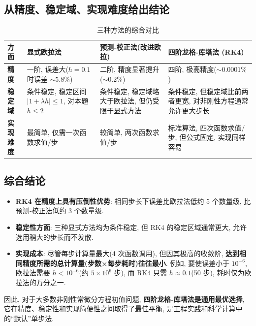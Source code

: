 \documentclass[12pt,a4paper]{ctexart}
\begin{document}
\subsection{从精度、稳定域、实现难度给出结论}

\begin{table}[H]
\centering
\caption{三种方法的综合对比}
\begin{tabularx}{\textwidth}{lXXX}
\toprule
方面 & 显式欧拉法 & 预测‑校正法(改进欧拉) & 四阶龙格‑库塔法 (RK4) \\
\midrule
\textbf{精度}   & 一阶, 误差大($h=0.1$ 时误差 $\sim 5.8\%$) 
                & 二阶, 精度显著提升($\sim 0.2\%$) 
                & 四阶, 极高精度($\sim 0.0001\%$) \\
\textbf{稳定域} & 条件稳定, 稳定区间 $|1+\lambda h|\le1$, 对本题 $h\le2$ 
                & 条件稳定, 稳定域略大于欧拉法, 但仍受限于显式方法 
                & 条件稳定, 但稳定域比前两者更宽, 对非刚性方程通常允许更大步长 \\
\textbf{实现难度} & 最简单, 仅需一次函数求值/步 
                & 较简单, 两次函数求值/步 
                & 标准算法, 四次函数求值/步, 但公式固定, 实现同样容易 \\
\bottomrule
\end{tabularx}
\end{table}

\subsection*{综合结论}

\begin{itemize}
    \item \textbf{RK4 在精度上具有压倒性优势}: 相同步长下误差比欧拉法低约 5 个数量级, 比预测‑校正法低约 3 个数量级. 
    \item \textbf{稳定性方面}: 三种显式方法均为条件稳定, 但 RK4 的稳定区域通常更大, 允许选用稍大的步长而不发散. 
    \item \textbf{实现成本}: 尽管每步计算量最大(4 次函数调用), 但因其极高的收敛阶, \textbf{达到相同精度所需的总计算量(步数×每步耗时)往往最小}. 例如, 要使误差小于 $10^{-6}$, 欧拉法需要 $h<10^{-6}$(约 $5\times10^6$ 步), 而 RK4 只需 $h\approx0.1$(50 步), 耗时仅为欧拉法的万分之一. 
\end{itemize}

\noindent 因此, 对于大多数非刚性常微分方程初值问题, \textbf{四阶龙格‑库塔法是通用最优选择}, 它在精度、稳定性和实现简便性之间取得了最佳平衡, 是工程实践和科学计算中的“默认”单步法. 
\appendix
\end{document}
